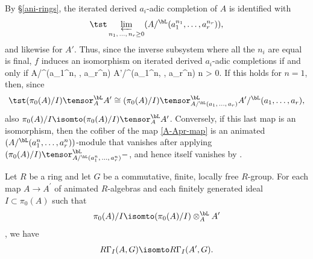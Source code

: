 \bpf
By \S\ref{ani-rings}, the iterated derived $a_i$-adic completion of $A$ is identified with
\[
\tst \varprojlim_{n_1,\, \dotsc,\, n_r \ge 0} (A/^\bL(a_1^{n_1}, \dotsc, a_r^{n_r})),
\]
and likewise for $A'$. Thus, since the inverse subsystem where all the $n_i$ are equal is final, $f$ induces an isomorphism on iterated derived $a_i$-adic completions if and only if
\be \label{A-Apr-map}
A/^\bL(a_1^n, \dotsc, a_r^n) \isomto A'/^\bL(a_1^n, \dotsc, a_r^n)  n > 0.
\ee
If this holds for $n = 1$, then, since
\[
\tst (\pi_0(A)/I) \tensor^\bL_A A' \cong (\pi_0(A)/I) \tensor^\bL_{A/^\bL(a_1,\, \dotsc,\, a_r)} A'/^\bL(a_1, \dotsc, a_r),
\]
also $\pi_0(A)/I \isomto (\pi_0(A)/I) \tensor^\bL_A A'$. Conversely, if this last map is an isomorphism, then
the cofiber of the map \eqref{A-Apr-map} is an animated $(A/^\bL(a_1^n, \dotsc, a_r^n))$-module that vanishes after applying $(\pi_0(A)/I) \tensor^\bL_{A/^\bL(a_1^n,\, \dotsc,\, a_r^n)} -$, and hence  itself vanishes by .
\epf



\bthm\label{cor:excision}
Let $R$ be a ring and let $G$ be a commutative, finite, locally free $R$-group. For each map $A\to A^\prime$ of animated $R$-algebras and each finitely generated ideal $I\subset \pi_0(A)$ such that
\[
\pi_0(A)/I \isomto (\pi_0(A)/I)\otimes^\bL_A A'
\]
, we have
\[
R\Gamma_I(A, G) \isomto R\Gamma_{I}(A^\prime,G). %
\]
\ethm

